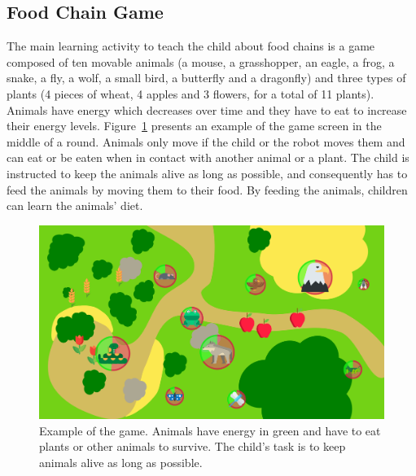 \subsection{Food Chain Game}

The main learning activity to teach the child about food chains is a game composed of ten movable animals (a mouse, a grasshopper, an eagle, a frog, a snake, a fly, a wolf, a small bird, a butterfly and a dragonfly) and three types of plants (4 pieces of wheat, 4 apples and 3 flowers, for a total of 11 plants). Animals have energy which decreases over time and they have to eat to increase their energy levels. Figure~\ref{fig:tutoring_game} presents an example of the game screen in the middle of a round. Animals only move if the child or the robot moves them and can eat or be eaten when in contact with another animal or a plant. The child is instructed to keep the animals alive as long as possible, and consequently has to feed the animals by moving them to their food. By feeding the animals, children can learn the animals' diet. 

\begin{figure}[ht]
	\centering
		\includegraphics[width=1\textwidth]{game.png}
		\caption{Example of the game. Animals have energy in green and have to eat plants or other animals to survive. The child's task is to keep animals alive as long as possible.}
		\label{fig:tutoring_game}
\end{figure}

